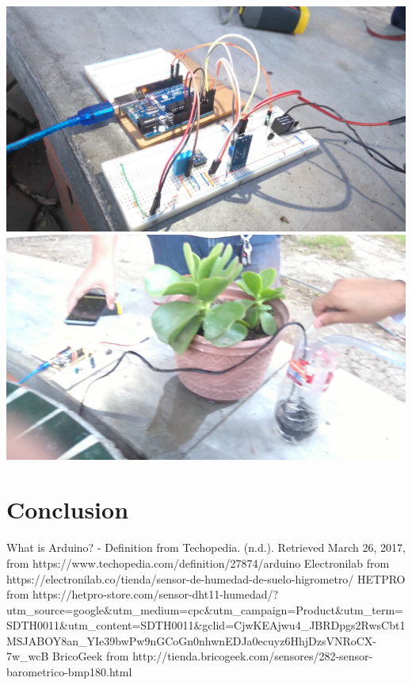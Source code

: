 \documentclass{article}
\begin{document}
\includegraphics[width=\textwidth]{captura/4}
\includegraphics[width=\textwidth]{captura/5}

\newpage
\section{Conclusion}

\renewcommand\refname{Referencias}
\begin{thebibliography}{1}
	 What is Arduino? - Definition from Techopedia. (n.d.). Retrieved March 26, 2017, from https://www.techopedia.com/definition/27874/arduino
	 Electronilab from https://electronilab.co/tienda/sensor-de-humedad-de-suelo-higrometro/
	 HETPRO from https://hetpro-store.com/sensor-dht11-humedad/?utm\_source=google\&utm\_medium=cpc\&utm\_campaign=Product\&utm\_term=SDTH0011\&utm\_content=SDTH0011\&gclid=CjwKEAjwu4\_JBRDpgs2RwsCbt1MSJABOY8an\_YIe39bwPw9nGCoGn0nhwnEDJa0ecuyz6HhjDzsVNRoCX-7w\_wcB
	 BricoGeek from http://tienda.bricogeek.com/sensores/282-sensor-barometrico-bmp180.html
\end{thebibliography}
\end{document}

